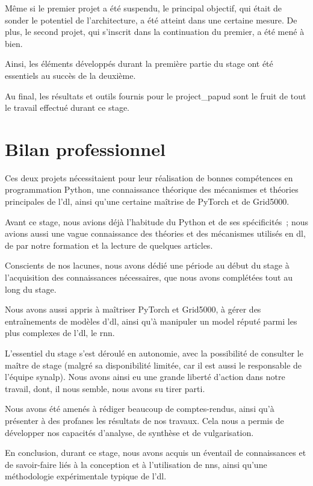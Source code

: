 Même si le premier projet a été suspendu, le principal objectif, qui était de sonder le potentiel de l'architecture, a été atteint dans une certaine mesure. De plus, le second projet, qui s'inscrit dans la continuation du premier, a été mené à bien.

Ainsi, les éléments développés durant la première partie du stage ont été essentiels au succès de la deuxième.

Au final, les résultats et outils fournis pour le \gls{project_papud} sont le fruit de tout le travail effectué durant ce stage.

\section{Bilan professionnel}
Ces deux projets nécessitaient pour leur réalisation de bonnes compétences en programmation Python, une connaissance théorique des mécanismes et théories principales de l'\gls{dl}, ainsi qu'une certaine maîtrise de PyTorch et de Grid5000.

Avant ce stage, nous avions déjà l'habitude du Python et de ses spécificités~; nous avions aussi une vague connaissance des théories et des mécanismes utilisés en \gls{dl}, de par notre formation et la lecture de quelques articles.

Conscients de nos lacunes, nous avons dédié une période au début du stage à l'acquisition des connaissances nécessaires, que nous avons complétées tout au long du stage.

Nous avons aussi appris à maîtriser PyTorch et Grid5000, à gérer des entraînements de modèles d'\gls{dl}, ainsi qu'à  manipuler un \gls{model} réputé parmi les plus complexes de l'\gls{dl}, le \gls{rnn}.


L'essentiel du stage s'est déroulé en autonomie, avec la possibilité de consulter le maître de stage (malgré sa disponibilité limitée, car il est aussi le responsable de l'équipe \gls{synalp}). Nous avons ainsi eu une grande liberté d'action dans notre travail, dont, il nous semble, nous avons su tirer parti.

Nous avons été amenés à rédiger beaucoup de comptes-rendus, ainsi qu'à présenter à des profanes les résultats de nos travaux. Cela nous a permis de développer nos capacités d'analyse, de synthèse et de vulgarisation.

En conclusion, durant ce stage, nous avons acquis un éventail de connaissances et de \mbox{savoir-faire} liés à la conception et à l'utilisation de \glspl{nn}, ainsi qu'une méthodologie expérimentale typique de l'\gls{dl}.

